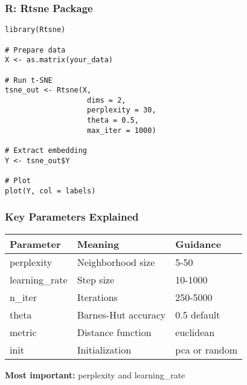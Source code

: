 \documentclass[aspectratio=169]{beamer}
\begin{document}
\begin{frame}[fragile]
\frametitle{R: Rtsne Package}

\begin{verbatim}
library(Rtsne)

# Prepare data
X <- as.matrix(your_data)

# Run t-SNE
tsne_out <- Rtsne(X,
                   dims = 2,
                   perplexity = 30,
                   theta = 0.5,
                   max_iter = 1000)

# Extract embedding
Y <- tsne_out$Y

# Plot
plot(Y, col = labels)
\end{verbatim}

\end{frame}

\begin{frame}
\frametitle{Key Parameters Explained}

\begin{center}
\small
\begin{tabular}{l|l|l}
\textbf{Parameter} & \textbf{Meaning} & \textbf{Guidance}\\
\hline
perplexity & Neighborhood size & 5-50\\
learning\_rate & Step size & 10-1000\\
n\_iter & Iterations & 250-5000\\
theta & Barnes-Hut accuracy & 0.5 default\\
metric & Distance function & euclidean\\
init & Initialization & pca or random\\
\end{tabular}
\end{center}

\vspace{0.3cm}
\textbf{Most important:} perplexity and learning\_rate

\end{frame}
\end{document}
